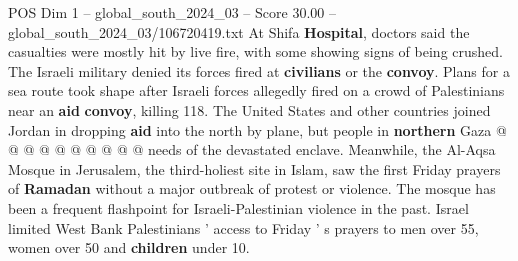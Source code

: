 \begin{textsample}{POS Dim 1 – global\_south\_2024\_03 – Score 30.00 – global\_south\_2024\_03/106720419.txt}
At Shifa \textbf{Hospital}, doctors said the casualties were mostly hit by live fire, with some showing signs of being crushed.
The Israeli military denied its forces fired at \textbf{civilians} or the \textbf{convoy}.
Plans for a sea route took shape after Israeli forces allegedly fired on a crowd of Palestinians near an \textbf{aid} \textbf{convoy}, killing 118.
The United States and other countries joined Jordan in dropping \textbf{aid} into the north by plane, but people in \textbf{northern} Gaza @ @ @ @ @ @ @ @ @ @ needs of the devastated enclave.
Meanwhile, the Al-Aqsa Mosque in Jerusalem, the third-holiest site in Islam, saw the first Friday prayers of \textbf{Ramadan} without a major outbreak of protest or violence.
The mosque has been a frequent flashpoint for Israeli-Palestinian violence in the past.
Israel limited West Bank Palestinians ' access to Friday ' s prayers to men over 55, women over 50 and \textbf{children} under 10.

\end{textsample}
